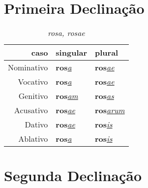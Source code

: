 \documentclass{article}
\newcommand{\radicaldesinencia}[2]{\textbf{#1}\textit{\underline{#2}}}
\begin{document}

\section*{Primeira Declinação}

\begin{table}[H]
\centering
\caption*{\textit{rosa, rosae}}
\vspace{0.2cm}
\begin{tabular}{r|l|l}
\hline
caso			&	singular					& plural 						\\
\hline                                    		
\hline
Nominativo	&	\radicaldesinencia{ros}{a}	& \radicaldesinencia{ros}{ae}	\\
Vocativo		&	\radicaldesinencia{ros}{a}	& \radicaldesinencia{ros}{ae}	\\
Genitivo		&	\radicaldesinencia{ros}{am}	& \radicaldesinencia{ros}{as}	\\
Acusativo	&	\radicaldesinencia{ros}{ae}	& \radicaldesinencia{ros}{arum}	\\
Dativo		&	\radicaldesinencia{ros}{ae}	& \radicaldesinencia{ros}{is}		\\
Ablativo		&	\radicaldesinencia{ros}{a}	& \radicaldesinencia{ros}{is}		\\


 \hline
\end{tabular}
\end{table}


\clearpage






\section*{Segunda Declinação}
\end{document}
